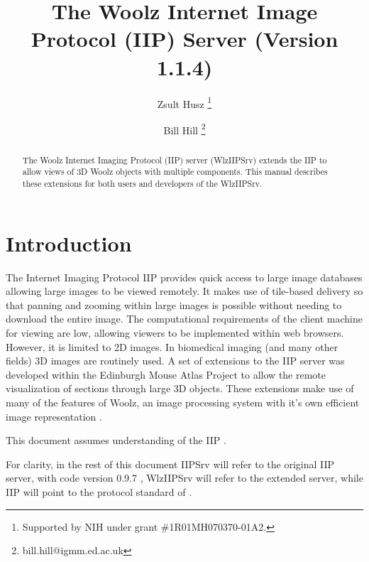 \documentclass[11pt]{article}
\title{The Woolz Internet Image Protocol (IIP) Server (Version 1.1.4)}
\author{
  Zsult Husz \footnote{Supported by {NIH} under grant \#1R01MH070370-01A2.} \\
  \and
  Bill Hill \footnote{bill.hill@igmm.ed.ac.uk}
}
\begin{document}
\maketitle

\begin{abstract}
The Woolz Internet Imaging Protocol (IIP) server (WlzIIPSrv) extends
the {IIP} to allow views of 3D Woolz objects with multiple components.
This manual describes these extensions for both users and developers
of the WlzIIPSrv.
\end{abstract}


\newpage

\tableofcontents
{}

\newpage


\section{Introduction}

The Internet Imaging Protocol {IIP} provides quick access to large image
databases allowing large images to be viewed remotely. It makes use of
tile-based delivery so that panning and zooming within large images
is  possible without needing to download the entire image.
The computational requirements of the client machine for viewing are low,
allowing viewers to be implemented within web browsers.
However, it is limited to 2D images.
In biomedical imaging (and many other fields) {3D} images are routinely used.
A set of extensions to the {IIP} server was developed within the Edinburgh
Mouse Atlas Project \cite{EMAP} to allow the remote visualization of sections
through large 3D objects.
These extensions make use of many of the features of Woolz, an image
processing system with it's own efficient image representation \cite{WOOLZ}.

This document assumes understanding of the IIP \citep{IIP97}.

For clarity, in the rest of this document IIPSrv will refer to the original
{IIP}  server, with code version 0.9.7 \citep{IIPSRV097}, WlzIIPSrv will refer
to the extended server, while IIP will point to the protocol standard of
\cite{IIP97}.
\end{document}

